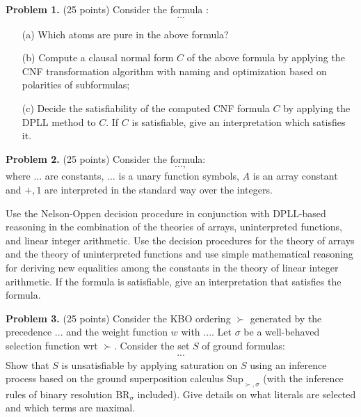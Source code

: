 \documentclass{article}[8pt]
\begin{document}
\pagestyle{empty}
\header



\medskip

\noindent
{\bf Problem 1.} (25 points)
Consider the formula :
\[ \ldots\]
\begin{itemize}
\item[(a)]
Which atoms are pure in the above formula?
\item[(b)] Compute a clausal normal form $C$ of the above formula by
  applying the CNF transformation algorithm with naming and
  optimization based on polarities of subformulas;
\item[(c)] Decide the satisfiability of the computed CNF formula $C$
  by applying  the DPLL method to $C$. If $C$ is
satisfiable,  give an interpretation which
satisfies it.
\end{itemize}

\medskip

\noindent
{\bf Problem 2.} (25 points) %
Consider the formula:
\[\ldots,\]
where $\ldots$  are constants,
$\ldots$ is a unary function symbols,
$A$ is an array constant  and
$+, 1$ are interpreted
in the standard way over the integers. \medskip


\noindent
Use the Nelson-Oppen decision procedure in conjunction with DPLL-based
reasoning in the combination of the theories of arrays,
uninterpreted functions, and linear integer arithmetic.
Use the decision procedures for the theory of arrays and the theory of uninterpreted functions and use
simple mathematical reasoning for deriving new equalities among the
constants in the theory of linear integer arithmetic.
If the formula is satisfiable, give an interpretation that satisfies the formula.\bigskip

\noindent
{\bf Problem 3.} (25 points)
Consider the KBO ordering $\succ$ generated by the precedence
$ ... $ and the weight function $w$ with $... $.
Let $\sigma$ be a well-behaved selection function
wrt $\succ$.  Consider the set $S$ of ground formulas:
\[
  \begin{array}{l}
...
\end{array}
\]
\noindent Show that $S$ is unsatisfiable by applying saturation on $S$ using an
inference process based on the ground superposition
calculus $\textrm{Sup}_{\succ,\sigma}$ (with the inference rules of
binary  resolution $\textrm{BR}_{\sigma}$ included).
 Give details on what literals
 are selected and which terms are maximal. \bigskip
\end{document}
